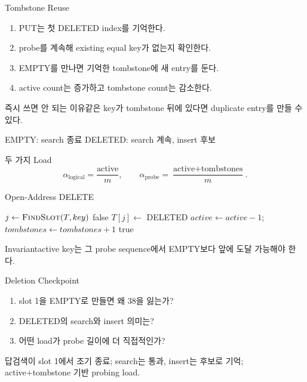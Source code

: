 \begin{frame}{Tombstone Reuse}
\begin{enumerate}
\item PUT는 첫 DELETED index를 기억한다.
\item probe를 계속해 existing equal key가 없는지 확인한다.
\item EMPTY를 만나면 기억한 tombstone에 새 entry를 둔다.
\item active count는 증가하고 tombstone count는 감소한다.
\end{enumerate}
\begin{alertblock}{즉시 쓰면 안 되는 이유}같은 key가 tombstone 뒤에 있다면 duplicate entry를 만들 수 있다.\end{alertblock}
\begin{center}\large
\textcolor{AlgoBlue}{EMPTY: search 종료}\qquad
\textcolor{AlgoOrangeText}{DELETED: search 계속, insert 후보}
\end{center}
\end{frame}
\begin{frame}{두 가지 Load}
\[
\alpha_{\text{logical}}=\frac{\text{active}}{m},\qquad
\alpha_{\text{probe}}=\frac{\text{active}+\text{tombstones}}{m}.
\]
\end{frame}
\begin{frame}{Open-Address DELETE}
\begin{algorithmic}[1]
\State $j\gets\Call{FindSlot}{T,key}$
\State\Return false\EndIf
\State $T[j]\gets$ DELETED
\State $active\gets active-1$; $tombstones\gets tombstones+1$
\State \Return true
\EndProcedure
\end{algorithmic}
\begin{block}{Invariant}active key는 그 probe sequence에서 EMPTY보다 앞에 도달 가능해야 한다.\end{block}
\end{frame}
\begin{frame}{Deletion Checkpoint}
\begin{enumerate}\item slot 1을 EMPTY로 만들면 왜 38을 잃는가?\item DELETED의 search와 insert 의미는?\item 어떤 load가 probe 길이에 더 직접적인가?\end{enumerate}
\begin{exampleblock}{답}검색이 slot 1에서 조기 종료; search는 통과, insert는 후보로 기억; active+tombstone 기반 probing load.\end{exampleblock}
\end{frame}
